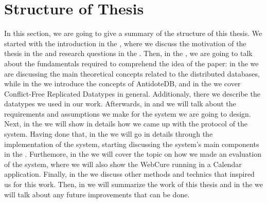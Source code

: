 \section{Structure of Thesis}

In this section, we are going to give a summary of the structure of this thesis. We started with the introduction in the , where we discuss the motivation of the thesis in the  and research questions in the . Then, in the , we are going to talk about the fundamentals required to comprehend the idea of the paper: in the  we are discussing the main theoretical concepts related to the distributed databases, while in the  we introduce the concepts of AntidoteDB, and in the  we cover Conflict-Free Replicated Datatypes in general. Additionaly, there we describe the datatypes we used in our work. Afterwards, in  and  we will talk about the requirements and assumptions we make for the system we are going to design. Next, in the  we will show in details how we came up with the protocol of the system. Having done that, in the  we will go in details through the implementation of the system, starting discussing the system's main components in the . Furthemore, in the  we will cover the topic on how we made an evaluation of the system, where we will also show the WebCure running in a Calendar application. Finally, in the  we discuss other methods and technics that inspired us for this work. Then, in  we will summarize the work of this thesis and in the  we will talk about any future improvements that can be done. 